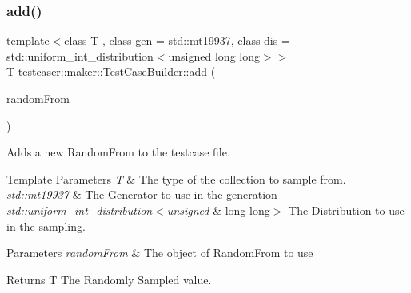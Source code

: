 \subsubsection{\texorpdfstring{add()}{add()}\hspace{0.1cm}{\footnotesize\ttfamily [3/11]}}
{\footnotesize\ttfamily template$<$class T , class gen  = std\+::mt19937, class dis  = std\+::uniform\+\_\+int\+\_\+distribution$<$unsigned long long$>$$>$ \\
T testcaser\+::maker\+::\+Test\+Case\+Builder\+::add (\begin{DoxyParamCaption}\item[{\mbox{\hyperlink{structtestcaser_1_1maker_1_1types_1_1RandomFrom}{types\+::\+Random\+From}}$<$ T, gen, dis $>$ \&}]{random\+From }\end{DoxyParamCaption})\hspace{0.3cm}{\ttfamily [inline]}}



Adds a new Random\+From to the testcase file. 


\begin{DoxyTemplParams}{Template Parameters}
{\em T} & The type of the collection to sample from. \\
\hline
{\em std\+::mt19937} & The Generator to use in the generation \\
\hline
{\em std\+::uniform\+\_\+int\+\_\+distribution$<$unsigned} & long long$>$ The Distribution to use in the sampling. \\
\hline
\end{DoxyTemplParams}

\begin{DoxyParams}{Parameters}
{\em random\+From} & The object of Random\+From to use \\
\hline
\end{DoxyParams}
\begin{DoxyReturn}{Returns}
T The Randomly Sampled value. 
\end{DoxyReturn}
\mbox{\label{classtestcaser_1_1maker_1_1TestCaseBuilder_a2ef119caff9fb4bd1b313964af9e77e0}} 
